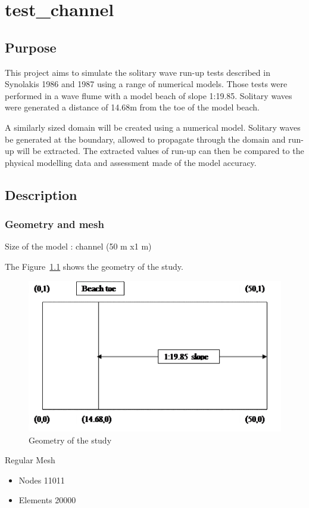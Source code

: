 \chapter{test\_channel}


\section{Purpose}
This project aims to simulate the solitary wave run-up tests described in
Synolakis 1986\cite{Synolakis1986} and 1987\cite{Synolakis1987} using a range
of numerical models. Those tests were performed in a wave flume with a model
beach of slope 1:19.85. Solitary waves were generated a distance of 14.68m from
the toe of the model beach.

A similarly sized domain will be created using a numerical model. Solitary
waves be generated at the boundary, allowed to propagate through the domain and
run-up will be extracted.  The extracted values of run-up can then be compared
to the physical modelling data and assessment made of the model accuracy.

\section{Description}

\subsection{Geometry and mesh}

Size of the model : channel (50 m x1 m)

The Figure~\ref{fig:tests:geometry} shows the geometry of the study.
\begin{figure}
\centering
\includegraphics[width=.6\textwidth]{img/geometry.png}
\caption{Geometry of the study}\label{fig:tests:geometry}
\end{figure}

Regular Mesh
\begin{itemize}
\item Nodes   11011
\item Elements  20000
\end{itemize}

